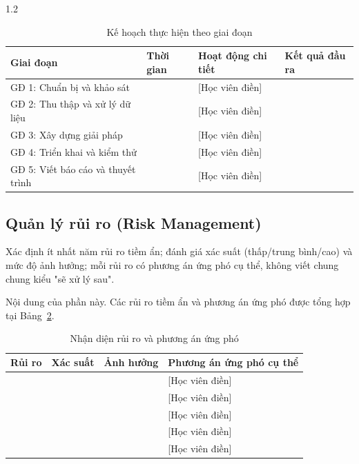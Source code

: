 \begin{spacing}{1.2}
\begin{table}[htpb]
\centering
\caption{Kế hoạch thực hiện theo giai đoạn}
\label{tab:timeline}
\renewcommand{\arraystretch}{1.3}
{\fontsize{12}{14}\selectfont
\begin{tabularx}{\textwidth}{|>{\raggedright\arraybackslash}p{4.2cm}|>{\centering\arraybackslash}p{2.2cm}|X|>{\raggedright\arraybackslash}p{3.4cm}|}
\hline
\textbf{Giai đoạn} & \textbf{Thời gian} & \textbf{Hoạt động chi tiết} & \textbf{Kết quả đầu ra} \\
\hline
GĐ 1: Chuẩn bị và khảo sát & [Điền] & [Học viên điền] & [Điền] \\
\hline
GĐ 2: Thu thập và xử lý dữ liệu & [Điền] & [Học viên điền] & [Điền] \\
\hline
GĐ 3: Xây dựng giải pháp & [Điền] & [Học viên điền] & [Điền] \\
\hline
GĐ 4: Triển khai và kiểm thử & [Điền] & [Học viên điền] & [Điền] \\
\hline
GĐ 5: Viết báo cáo và thuyết trình & [Điền] & [Học viên điền] & [Điền] \\
\hline
\end{tabularx}
}
\end{table}

\subsection{Quản lý rủi ro (Risk Management)}
\label{subsec:rui_ro}

\begin{huongdan}
Xác định ít nhất năm rủi ro tiềm ẩn; đánh giá xác suất (thấp/trung bình/cao) và mức độ ảnh hưởng; mỗi rủi ro có phương án ứng phó cụ thể, không viết chung chung kiểu "sẽ xử lý sau".
\end{huongdan}

Nội dung của phần này. Các rủi ro tiềm ẩn và phương án ứng phó được tổng hợp tại Bảng~\ref{tab:rui_ro}.

\begin{table}[htpb]
\centering
\caption{Nhận diện rủi ro và phương án ứng phó}
\label{tab:rui_ro}
\renewcommand{\arraystretch}{1.3}
{\fontsize{12}{14}\selectfont
\begin{tabularx}{\textwidth}{|X|>{\centering\arraybackslash}p{2.7cm}|>{\centering\arraybackslash}p{2.7cm}|X|}
\hline
\textbf{Rủi ro} & \textbf{Xác suất} & \textbf{Ảnh hưởng} & \textbf{Phương án ứng phó cụ thể} \\
\hline
[Học viên điền] & [Thấp/TB/Cao] & [Thấp/TB/Cao] & [Học viên điền] \\
\hline
[Học viên điền] & [Thấp/TB/Cao] & [Thấp/TB/Cao] & [Học viên điền] \\
\hline
[Học viên điền] & [Thấp/TB/Cao] & [Thấp/TB/Cao] & [Học viên điền] \\
\hline
[Học viên điền] & [Thấp/TB/Cao] & [Thấp/TB/Cao] & [Học viên điền] \\
\hline
[Học viên điền] & [Thấp/TB/Cao] & [Thấp/TB/Cao] & [Học viên điền] \\
\hline
\end{tabularx}
}
\end{table}


\end{spacing}
